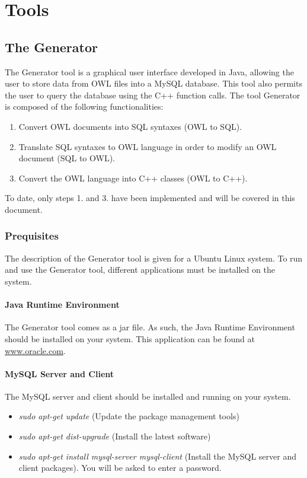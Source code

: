 \section{Tools}\label{tools}


\subsection{The Generator}\label{generator}
The Generator tool is a graphical user interface developed in Java, allowing the user to store data from OWL files into a MySQL database. This tool also permits the user to query the database using the C++ function calls. The tool Generator is composed of the following functionalities:
\begin{enumerate}
 \item Convert OWL documents into SQL syntaxes (OWL to SQL).
 \item Translate SQL syntaxes to OWL language in order to modify an OWL document (SQL to OWL).
 \item Convert the OWL language into C++ classes (OWL to C++).
\end{enumerate}

To date, only steps 1. and 3. have been implemented and will be covered in this document.

\subsubsection{Prequisites}\label{s:prequisites}
The description of the Generator tool is given for a Ubuntu Linux system. To run and use the Generator tool, different applications must be installed on the system.

\paragraph{Java Runtime Environment}
The Generator tool comes as a jar file. As such, the Java Runtime Environment should be installed on your system. This application can be found at \url{www.oracle.com}.

\paragraph{MySQL Server and Client}
The MySQL server and client should be installed and running on your system.
\begin{itemize}
 \item \textit{sudo apt-get update} (Update the package management tools)
 \item \textit{sudo apt-get dist-upgrade} (Install the latest software)
 \item \textit{sudo apt-get install mysql-server mysql-client} (Install the MySQL server and client packages). You will be asked to enter a password.
\end{itemize}

